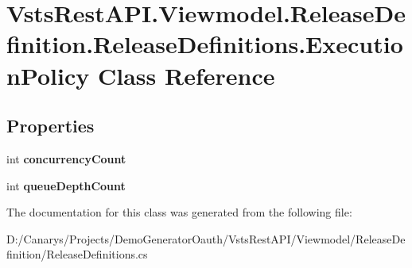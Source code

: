 \hypertarget{class_vsts_rest_a_p_i_1_1_viewmodel_1_1_release_definition_1_1_release_definitions_1_1_execution_policy}{}\section{Vsts\+Rest\+A\+P\+I.\+Viewmodel.\+Release\+Definition.\+Release\+Definitions.\+Execution\+Policy Class Reference}
\label{class_vsts_rest_a_p_i_1_1_viewmodel_1_1_release_definition_1_1_release_definitions_1_1_execution_policy}
\subsection*{Properties}
\begin{DoxyCompactItemize}
\item 
\mbox{\label{class_vsts_rest_a_p_i_1_1_viewmodel_1_1_release_definition_1_1_release_definitions_1_1_execution_policy_ac548ec685a7a82c0fe18b6b43de13e71}} 
int {\bfseries concurrency\+Count}
\item 
\mbox{\label{class_vsts_rest_a_p_i_1_1_viewmodel_1_1_release_definition_1_1_release_definitions_1_1_execution_policy_a4f9cbe02ddb0d2ac9b6b06f77f1131ce}} 
int {\bfseries queue\+Depth\+Count}
\end{DoxyCompactItemize}


The documentation for this class was generated from the following file\+:\begin{DoxyCompactItemize}
\item 
D\+:/\+Canarys/\+Projects/\+Demo\+Generator\+Oauth/\+Vsts\+Rest\+A\+P\+I/\+Viewmodel/\+Release\+Definition/Release\+Definitions.\+cs\end{DoxyCompactItemize}
